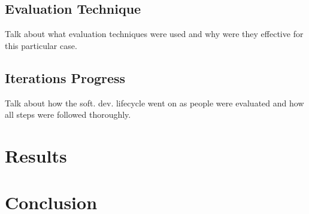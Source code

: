 \documentclass[paper=a4, fontsize=11pt]{scrartcl} %
\numberwithin{equation}{section} %
\numberwithin{figure}{section} %
\numberwithin{table}{section} %
\begin{document}

\subsection{Evaluation Technique}

\par
Talk about what evaluation techniques were used and why were they effective for this particular case.


\subsection{Iterations Progress}

\par
Talk about how the soft. dev. lifecycle went on as people were evaluated and how all steps were followed thoroughly.



\section{Results}



\section{Conclusion}



\end{document}
